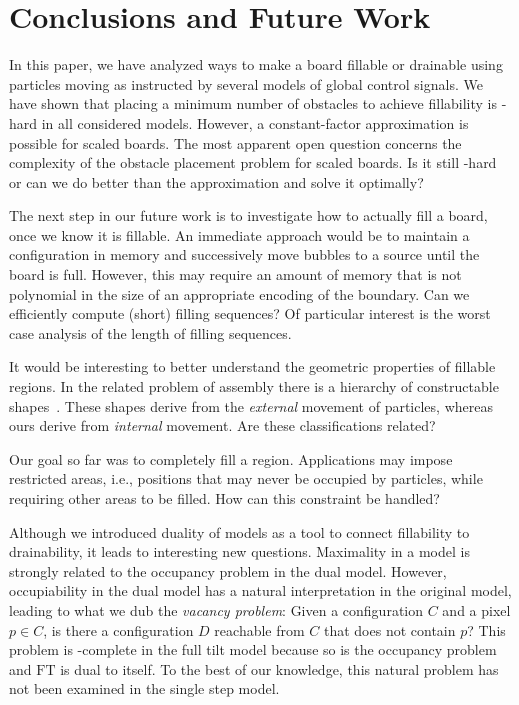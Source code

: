 \documentclass[a4paper,UKenglish,cleveref,thm-restate]{lipics-v2021}
\newcommand{\FT}{\ensuremath{\mathrm{FT}}\xspace}
\begin{document}
     \section{Conclusions and Future Work}\label{sec:conclusion}

In this paper, we have analyzed ways to make a board fillable or drainable using
particles moving as instructed by several models of global control signals. We
have shown that placing a minimum number of obstacles to
achieve fillability is \NP-hard in all considered models. However, a constant-factor approximation is
possible for scaled boards. The most apparent open question concerns the
complexity of the obstacle placement problem for scaled boards. Is it still
\NP-hard or can we do better than the approximation and solve it optimally?

The next step in our future work is to investigate how to actually fill a board,
once we know it is fillable. An immediate approach would be to maintain a
configuration in memory and successively move bubbles to a source until the board
is full. However, this may require an amount of memory that is not polynomial
in the size of an appropriate encoding of the boundary.
Can we efficiently compute (short) filling sequences? Of particular
interest is the worst case analysis of the length of filling sequences.

It would be interesting to better understand the geometric properties
of fillable regions. In the related problem of assembly there is a hierarchy of
constructable shapes~\cite{hierarchical2020}. These shapes derive from the
\emph{external} movement of particles, whereas ours derive from \emph{internal}
movement. Are these classifications related?

Our goal so far was to completely fill a region. Applications may
impose restricted areas, i.e., positions that may never be occupied by
particles, while requiring other areas to be filled. How can this constraint be
handled?

Although we introduced duality of models as a tool to connect fillability to
drainability, it leads to interesting new questions. Maximality in a model is
strongly related to the occupancy problem in the dual model. However,
occupiability in the dual model has a natural interpretation in the original
model, leading to what we dub the \emph{vacancy problem}: Given a configuration
$C$ and a pixel $p \in C$, is there a configuration $D$ reachable from $C$
that does not contain $p$?  This problem is \PSPACE-complete in the full tilt
model because so is the occupancy problem and \FT is dual to itself. To the best
of our knowledge, this natural problem has not been examined in the single step
model.
\end{document}
